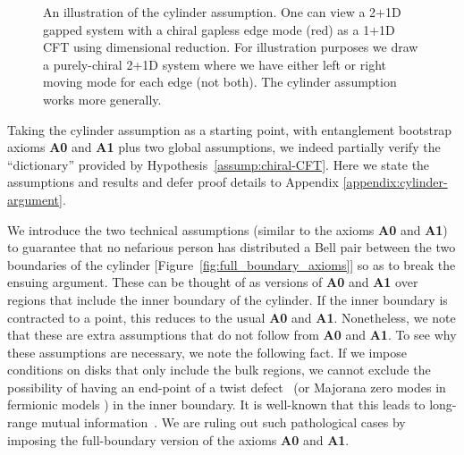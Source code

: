 \documentclass[12pt, nofootinbib]{article}
\theoremstyle{plain}
\theoremstyle{assumption}
\theoremstyle{definition}
\theoremstyle{plain}
\theoremstyle{plain}
\theoremstyle{plain}
\theoremstyle{plain}
\theoremstyle{plain}
\begin{document}
\begin{figure}[h]
    \caption{An illustration of the cylinder assumption. One can view a 2+1D gapped system with a chiral gapless edge mode (red) as a 1+1D CFT using dimensional reduction. For illustration purposes we draw a purely-chiral 2+1D system where we have either left or right moving mode for each edge (not both). The cylinder assumption works more generally.
    } 
    \label{fig:cylinder_argument}
\end{figure}
 

Taking the cylinder assumption as a starting point, with entanglement bootstrap axioms \textbf{A0} and \textbf{A1} plus two global assumptions, we indeed partially verify the ``dictionary'' provided by Hypothesis~\ref{assump:chiral-CFT}. Here we state the assumptions and results and defer proof details to Appendix \ref{appendix:cylinder-argument}.  


We introduce the two technical assumptions (similar to the axioms \textbf{A0} and \textbf{A1}) to guarantee that no nefarious person %
has distributed a Bell pair between the two boundaries of the cylinder [Figure~\ref{fig:full_boundary_axioms}] so as to break the ensuing argument. These can be thought of as versions of \textbf{A0} and \textbf{A1} over regions that include the inner boundary of the cylinder. If the inner boundary is contracted to a point, this reduces to the usual \textbf{A0} and \textbf{A1}. Nonetheless, we note that these are extra assumptions that do not follow from \textbf{A0} and \textbf{A1}. To see why these assumptions are necessary, we note the following fact. If we impose conditions on disks that only include the bulk regions, we cannot exclude the possibility of having an end-point of a twist defect~\cite{Bombin2010} (or Majorana zero modes in fermionic models \cite{Read1999}) in the inner boundary. It is well-known that this leads to long-range mutual information~\cite{Brown2013,Kim2014-1D}. We are ruling out such pathological cases by imposing the full-boundary version of the axioms \textbf{A0} and \textbf{A1}.
\end{document}
